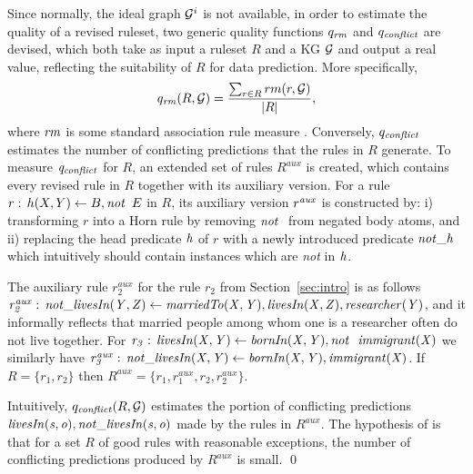 Since normally, the ideal graph $\mathcal{G}^i$ is not available, in order to estimate the quality of a
revised ruleset, two generic quality functions $q_{\mathit{rm}}$ and
$q_{\mathit{conflict}}$ are devised, which both take as input a ruleset $R$ and a KG $\mathcal{G}$ and output a
real value, reflecting the suitability of $R$ for data prediction.  More
specifically, 
\begin{equation}q_{\mathit{rm}} (R,\mathcal{G})=\dfrac{\sum_{r\in
    R}rm(r,\mathcal{G})}{|R|}, \end{equation}
     where $\mathit{rm}$ is some standard
association rule measure \cite{Azevedo2007}. %
Conversely, $q_{\mathit{conflict}}$ estimates the number of conflicting predictions that the rules in $R$ generate. To measure $\mathit{q_{conflict}}$ for $R$,
 an extended set of rules $R^{aux}$ is created, %
which contains every %
revised rule in $R$ %
together with %
its auxiliary version. For a rule $r:\,h(X,Y)\leftarrow B,\mathit{not}~ \,E$ in $R$,
its auxiliary version $r^{\mathit{aux}}$ is constructed by: i) transforming $r$ into a Horn rule by
removing %
$\naf$ from negated body atoms, %
and ii) replacing the head
predicate $\mathit{h}$ of $r$ %
with a newly introduced predicate $\mathit{not\_h}$ which intuitively should contain %
instances which are \emph{not} in $\mathit{h}$. 

\begin{example} The auxiliary rule $r_2^{aux}$ for the rule $r_2$ from Section~\ref{sec:intro} is as follows $\mathit{r_2^{aux}:\,not\_livesIn(Y,Z)\leftarrow marriedTo(X,Y),livesIn(X,Z),researcher(Y)}$, and it informally reflects that married people among whom one is a researcher often do not live together. For $\mi{r_3:\,livesIn(X,Y)\leftarrow bornIn(X,Y),\naf\ immigrant(X)}$ we similarly have $\mathit{r_3^{aux}:\,not\_livesIn(X,Y)\leftarrow bornIn(X,Y),immigrant(X)}$. If $R=\{r_1,r_2\}$ then $R^{aux}=\{r_1,r_1^{aux},r_2,r_2^{aux}\}$. 

Intuitively, $q_{\mathit{conflict}}(R,\mathcal{G})$ estimates the portion of conflicting predictions \\$\mathit{livesIn(s,o),not\_livesIn(s,o)}$ made by the rules in $R^{aux}$. The hypothesis of \cite{gad2016,rumis} is that for a set $R$ of good rules with reasonable exceptions, the number of conflicting predictions produced by $R^{aux}$ is small.  \qed
\end{example}



